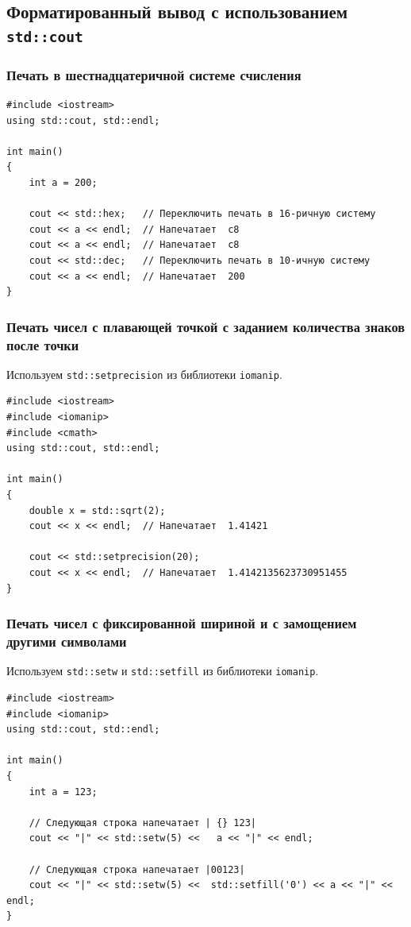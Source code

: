 \documentclass{article}
\begin{document}
\subsection*{Форматированный вывод с использованием \texttt{std::cout}}

\subsubsection*{Печать в шестнадцатеричной системе счисления}
\begin{lstlisting}
#include <iostream>
using std::cout, std::endl;

int main()
{
    int a = 200;
  
    cout << std::hex;   // Переключить печать в 16-ричную систему
    cout << a << endl;  // Напечатает  c8
    cout << a << endl;  // Напечатает  c8
    cout << std::dec;   // Переключить печать в 10-ичную систему
    cout << a << endl;  // Напечатает  200
}
\end{lstlisting}


\subsubsection*{Печать чисел с плавающей точкой с заданием количества знаков после точки}
Используем \texttt{std::setprecision} из библиотеки \texttt{iomanip}.
\begin{lstlisting}
#include <iostream>
#include <iomanip>
#include <cmath>
using std::cout, std::endl;

int main()
{
    double x = std::sqrt(2);
    cout << x << endl;  // Напечатает  1.41421
    
    cout << std::setprecision(20);
    cout << x << endl;  // Напечатает  1.4142135623730951455
}
\end{lstlisting}

\subsubsection*{Печать чисел с фиксированной шириной и с замощением другими символами}
Используем \texttt{std::setw} и \texttt{std::setfill} из библиотеки \texttt{iomanip}.
\begin{lstlisting}
#include <iostream>
#include <iomanip>
using std::cout, std::endl;

int main()
{
    int a = 123;
    
    // Следующая строка напечатает | {} 123|
    cout << "|" << std::setw(5) <<   a << "|" << endl;
    
    // Следующая строка напечатает |00123|
    cout << "|" << std::setw(5) <<  std::setfill('0') << a << "|" <<  endl;
}
\end{lstlisting}
\end{document}
